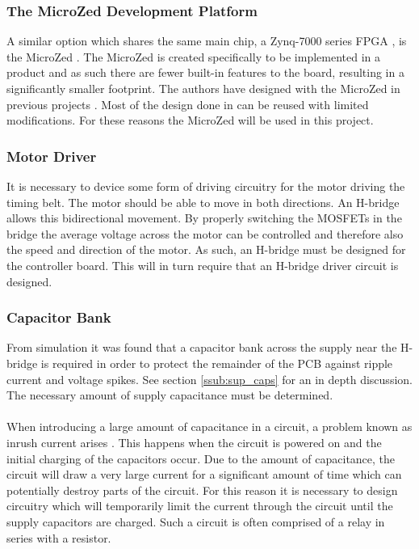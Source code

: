 \subsubsection{The MicroZed Development Platform} %
\label{ssub:microcontroller}
A similar option which shares the same main chip, a Zynq-7000 series FPGA \cite{zynq}, is the MicroZed \cite{microzed}.
The MicroZed is created specifically to be implemented in a product and as such there are fewer built-in features to the board, resulting in a significantly smaller footprint.
The authors have designed with the MicroZed in previous projects \cite{isaswarm}.
Most of the design done in \cite{isaswarm} can be reused with limited modifications.
For these reasons the MicroZed will be used in this project.

\subsubsection{Motor Driver}
It is necessary to device some form of driving circuitry for the motor driving the timing belt.
The motor should be able to move in both directions. 
An H-bridge allows this bidirectional movement.
By properly switching the MOSFETs in the bridge the average voltage across the motor can be controlled and therefore also the speed and direction of the motor.
As such, an H-bridge must be designed for the controller board. 
This will in turn require that an H-bridge driver circuit is designed.

\subsubsection{Capacitor Bank} %
From simulation it was found that a capacitor bank across the supply near the H-bridge is required in order to protect the remainder of the PCB against ripple current and voltage spikes.
See section \ref{ssub:sup_caps} for an in depth discussion.
The necessary amount of supply capacitance must be determined.
\\~\\
When introducing a large amount of capacitance in a circuit, a problem known as inrush current arises \cite{inrush}.
This happens when the circuit is powered on and the initial charging of the capacitors occur.
Due to the amount of capacitance, the circuit will draw a very large current for a significant amount of time which can potentially destroy parts of the circuit.
For this reason it is necessary to design circuitry which will temporarily limit the current through the circuit until the supply capacitors are charged.
Such a circuit is often comprised of a relay in series with a resistor.

